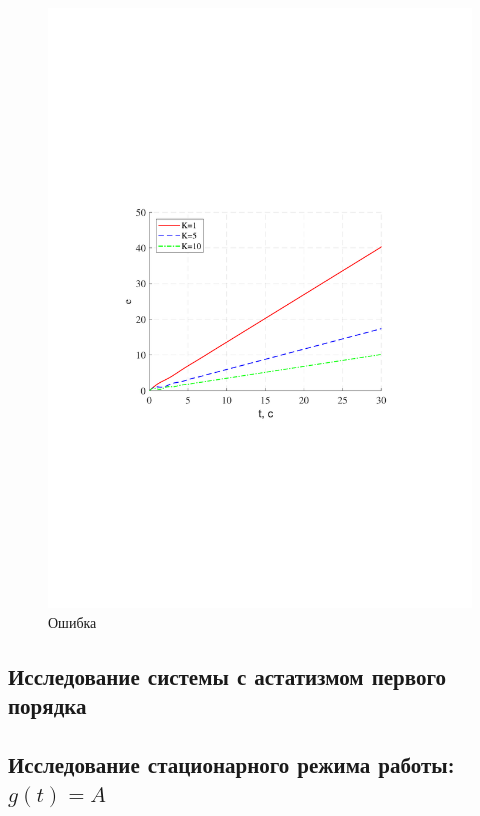 \documentclass[a4paper,12pt]{article}
\begin{document}
	\begin{figure}[h!]
		\begin{center}
		\renewcommand{\figurename}{Рисунок}
		\includegraphics[width=5in]{err2MOD.pdf}
		\caption{Ошибка}
		\label{s_6}
		\end{center}	
	\end{figure}
	
	\newpage
	
	\begin{center}
		\section{Исследование системы с астатизмом первого порядка}
	\end{center}
	
	\subsection{Исследование стационарного режима работы: $g(t)=A$}
\end{document}
